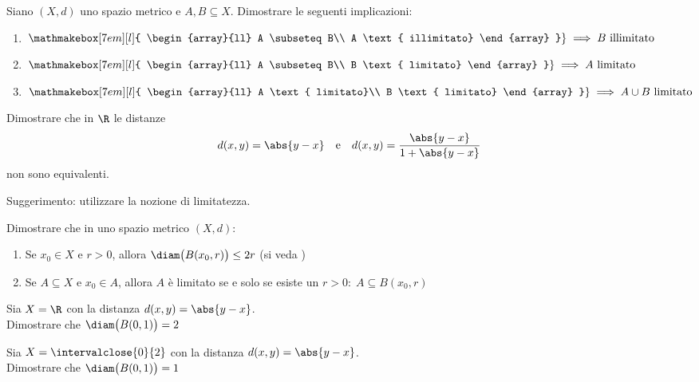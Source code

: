 \begin{exercise}
	Siano $(X,d)$ uno spazio metrico e $A,B\subseteq X$. Dimostrare le seguenti implicazioni:
	\begin{enumerate}
		\item $
			\left.
			\mathmakebox[7em][l]{
				\begin{array}{ll}
					A \subseteq B\\
					A \text{ illimitato}
				\end{array}
			}
			\right\} \implies B \text{ illimitato}$
		\item $
			\left.
			\mathmakebox[7em][l]{
				\begin{array}{ll}
				A \subseteq B\\
				B \text{ limitato}
				\end{array}
			}
			\right\} \implies A \text{ limitato}$
		\item $
			\left.
			\mathmakebox[7em][l]{
				\begin{array}{ll}
				A \text{ limitato}\\
				B \text{ limitato}
			\end{array}
			}
			\right\} \implies  A \cup B \text{ limitato}$
	\end{enumerate}
\end{exercise}
\begin{exercise}
	Dimostrare che in $\R$ le distanze
	\[d(x,y) = \abs{y-x} \quad \text{e} \quad d(x,y) = \frac{\abs{y-x}}{1+\abs{y-x}}\]
	non sono equivalenti.
	\begin{solution}
		Suggerimento: utilizzare la nozione di limitatezza.
	\end{solution}
\end{exercise}
\begin{exercise}
	\label{ex:sfere_e_limitatezza}
	Dimostrare che in uno spazio metrico $(X,d)$:
	\begin{enumerate}
		\item Se $x_0 \in X$ e $r > 0$, allora $\diam \bigl( B(x_0, r) \bigr) \leq 2r$ (si veda )
		\item Se $A \subseteq X$ e $x_0 \in A$, allora $A$ è limitato se e solo se esiste un $r>0:\; A \subseteq B(x_0,r)$
	\end{enumerate}
\end{exercise}
\begin{exercise}
	Sia $X = \R$ con la distanza $d(x,y) = \abs{y-x}$.\\
	Dimostrare che $\diam \bigl( B(0,1) \bigr) = 2$
\end{exercise}
\begin{exercise}
	\label{ex:diam_sp_metr}
	Sia $X = \intervalclose{0}{2}$ con la distanza $d(x,y) = \abs{y-x}$.\\
	Dimostrare che $\diam \bigl( B(0,1) \bigr) = 1$
\end{exercise}

